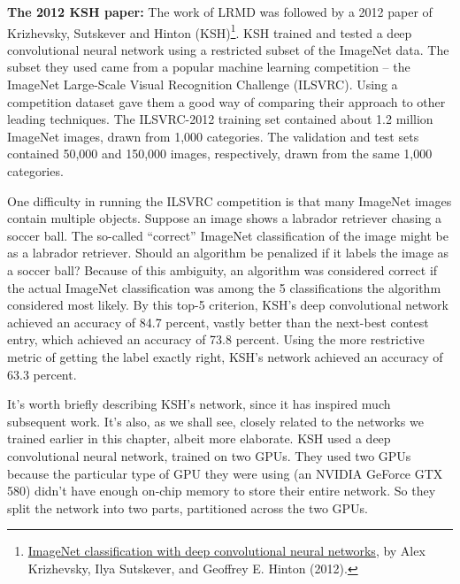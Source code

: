 \documentclass[a4paper,twoside,10pt]{book}
\begin{document}
\textbf{The 2012 KSH paper:} The work of LRMD was followed by a 2012 paper of Krizhevsky, Sutskever and Hinton (KSH)\footnote{\href{http://www.cs.toronto.edu/~fritz/absps/imagenet.pdf}{ImageNet classification with deep convolutional neural networks}, by Alex Krizhevsky, Ilya Sutskever, and Geoffrey E. Hinton (2012).}. KSH trained and tested a deep convolutional neural network using a restricted subset of the ImageNet data. The subset they used came from a popular machine learning competition -- the ImageNet Large-Scale Visual Recognition Challenge (ILSVRC). Using a competition dataset gave them a good way of comparing their approach to other leading techniques. The ILSVRC-2012 training set contained about 1.2 million ImageNet images, drawn from 1,000 categories. The validation and test sets contained 50,000 and 150,000 images, respectively, drawn from the same 1,000 categories.

One difficulty in running the ILSVRC competition is that many ImageNet images contain multiple objects. Suppose an image shows a labrador retriever chasing a soccer ball. The so-called ``correct'' ImageNet classification of the image might be as a labrador retriever. Should an algorithm be penalized if it labels the image as a soccer ball? Because of this ambiguity, an algorithm was considered correct if the actual ImageNet classification was among the 5 classifications the algorithm considered most likely. By this top-5 criterion, KSH's deep convolutional network achieved an accuracy of 84.7 percent, vastly better than the next-best contest entry, which achieved an accuracy of 73.8 percent. Using the more restrictive metric of getting the label exactly right, KSH's network achieved an accuracy of 63.3 percent.

It's worth briefly describing KSH's network, since it has inspired much subsequent work. It's also, as we shall see, closely related to the networks we trained earlier in this chapter, albeit more elaborate. KSH used a deep convolutional neural network, trained on two GPUs. They used two GPUs because the particular type of GPU they were using (an NVIDIA GeForce GTX 580) didn't have enough on-chip memory to store their entire network. So they split the network into two parts, partitioned across the two GPUs.
\end{document}

